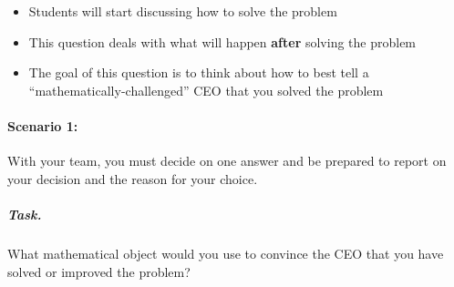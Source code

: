 \vspace{5mm}

\begin{annotation}
	\begin{notes}
		
		\begin{itemize}
			\item Students will start discussing how to solve the problem
			\item This question deals with what will happen \textbf{after} solving the problem
			\item The goal of this question is to think about how to best tell a ``mathematically-challenged'' CEO that you solved the problem
		\end{itemize}
	\end{notes}
\end{annotation}

\paragraph{Scenario 1:}

With your team, you must decide on one answer and be prepared to report on your decision and the reason for your choice.

\subparagraph{Task.} What mathematical object would you use to convince the CEO that you have solved or improved the problem?








\newpage



